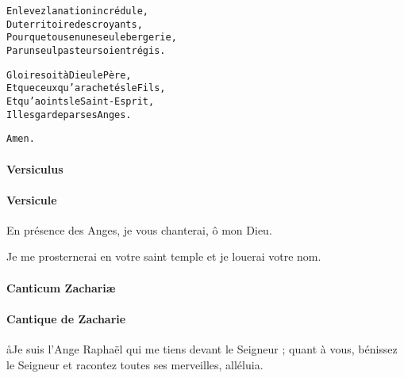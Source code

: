 \documentclass[twoside]{article}
\begin{document}
\begin{paracol}[1]{2}
\begin{alltt}
Enlevez la nation incrédule,
Du territoire des croyants,
Pour que tous en une seule bergerie,
Par un seul pasteur soient régis.

Gloire soit à Dieu le Père,
Et que ceux qu’a rachetés le Fils,
Et qu’a oints le Saint-Esprit,
Il les garde par ses Anges.

Amen.
\end{alltt}

\switchcolumn*

\paragraph{Versiculus}


\switchcolumn

\paragraph{Versicule}

\vv En présence des Anges, je vous chanterai, ô mon Dieu.

\rr Je me prosternerai en votre saint temple et je louerai votre nom.

\newpage

\switchcolumn*

\paragraph{Canticum Zachariæ}


\switchcolumn

\paragraph{Cantique de Zacharie}

\aa Je suis l’Ange Raphaël qui me tiens devant le Seigneur ; quant à vous, bénissez le Seigneur et racontez toutes ses merveilles, alléluia.


\switchcolumn*


\end{paracol}
\end{document}

